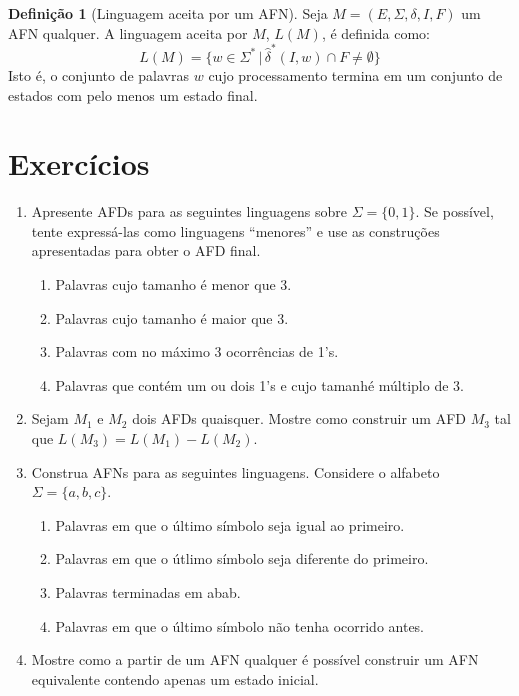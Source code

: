 \documentclass[a4paper]{article}
\theoremstyle{definition}
\newtheorem{Definition}{Definição}
\begin{document}
  \begin{Definition}[Linguagem aceita por um AFN]
    Seja $M=(E,\Sigma,\delta,I,F)$ um AFN qualquer. A linguagem aceita por $M$,
    $L(M)$, é definida como:
    \[
      L(M) =\{w\in\Sigma^*\,|\,\widehat{\delta}^*(I,w)\cap F \neq \emptyset\}
    \]
    Isto é, o conjunto de palavras $w$ cujo processamento termina em um conjunto
    de estados com pelo menos um estado final.
  \end{Definition}
  
  \section{Exercícios}

  \begin{enumerate}
    \item Apresente AFDs para as seguintes linguagens sobre $\Sigma = \{0,1\}$.
      Se possível, tente expressá-las como linguagens ``menores'' e use as
      construções apresentadas para obter o AFD final.
      \begin{enumerate}
        \item Palavras cujo tamanho é menor que 3.
        \item Palavras cujo tamanho é maior que 3.
        \item Palavras com no máximo 3 ocorrências de 1's.
        \item Palavras que contém um ou dois 1's e cujo tamanhé múltiplo de 3.
      \end{enumerate}
    \item Sejam $M_1$ e $M_2$ dois AFDs quaisquer. Mostre como construir um AFD
      $M_3$ tal que $L(M_3) = L(M_1) - L(M_2)$.
    \item Construa AFNs para as seguintes linguagens. Considere o alfabeto $\Sigma=\{a,b,c\}$.
      \begin{enumerate}
        \item Palavras em que o último símbolo seja igual ao primeiro.
        \item Palavras em que o útlimo símbolo seja diferente do primeiro.
        \item Palavras terminadas em abab.
        \item Palavras em que o último símbolo não tenha ocorrido antes.
        \end{enumerate}
    \item Mostre como a partir de um AFN qualquer é possível construir um AFN
      equivalente contendo apenas um estado inicial.
  \end{enumerate}
\end{document}
